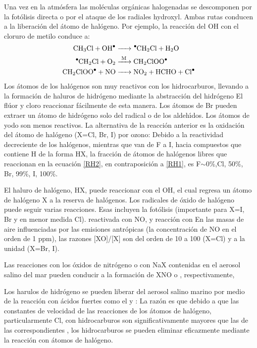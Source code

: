 Una vez en la atm\'osfera las mol\'eculas org\'anicas halogenadas se descomponen por la fot\'olisis directa o por el ataque de los radiales hydroxyl. Ambas rutas conducen a la liberaci\'on del \'atomo de hal\'ogeno. Por ejemplo, la reacci\'on del OH con el cloruro de metilo conduce a:
\begin{align*}
\ce{CH3Cl + OH^. &->  ^.CH2Cl + H2O \\
      ^.CH2Cl + O2 & ->[M] CH2ClOO^. \\
      CH2ClOO^. + NO & -> NO2 + HCHO + Cl^. }
\end{align*}
Los \'atomos de los hal\'ogenos son muy reactivos con los hidrocarburos, llevando a la formaci\'on de haluros de hidr\'ogeno mediante la abstracci\'on del hidr\'ogeno 
El fl\'uor y cloro reaccionar f\'acilmente de esta manera. Los \'atomos de Br pueden extraer un \'atomo de hidr\'ogeno solo del radical   o de los aldeh\'{\i}dos. Los \'atomos de yodo son menos reactivos. La alternativa de la reacci\'on anterior es la oxidaci\'on del \'atomo de hal\'ogeno (X=Cl, Br, I) por ozono:
Debido a la reactividad decreciente de los hal\'ogenos, mientras que van de F a I, hacia compuestos que contiene H de la forma HX, la fracci\'on de \'atomos de hal\'ogenos libres que reaccionan en la ecuaci\'on \ref{RH2}, en contraposici\'on a \ref{RH1}, es F$\sim$0\%,Cl, 50\%, Br, 99\%, I, 100\%.

El haluro de hal\'ogeno, HX, puede reaccionar con el OH,
el cual regresa un \'atomo de hal\'ogeno X a la reserva de hal\'ogenos. Los radicales de \'oxido de hal\'ogeno puede seguir varias reacciones. Esas incluyen la fot\'olisis (importante para X=I, Br y en menor medida Cl).
reactivada con NO,
y reacci\'on con 
En las masas de aire influenciadas por las emisiones antr\'opicas (la concentraci\'on de NO en el orden de 1 ppm), las razones [XO]/[X] son del orden de 10 a 100 (X=Cl) y a la unidad (X=Br, I).

Las reacciones con los \'oxidos de nitr\'ogeno  o  con NaX contenidas en el aerosol salino del mar pueden conducir a la formaci\'on de XNO o , respectivamente,

Los harulos de hidr\'ogeno se pueden liberar del aerosol salino marino por medio de la reacci\'on con \'acidos fuertes como el  y :
La raz\'on es que debido a que las constantes de velocidad de las reacciones de los \'atomos de hal\'ogeno, particularmente Cl, con hidrocarburos son significativamente mayores que las de las correspondientes , los hidrocarburos se pueden eliminar eficazmente mediante la reacci\'on con \'atomos de hal\'ogeno.

